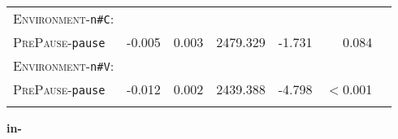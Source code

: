 \begin{table}
{\begin{tabular} {lrrrrrr}
		\textsc{Environment}-\texttt{n\#C}:&&&&&\\
		\textsc{PrePause}-\texttt{pause }&  \color{lsLightGray}-0.005& \color{lsLightGray}0.003& \color{lsLightGray}2479.329 &\color{lsLightGray} -1.731& \color{lsLightGray}0.084 \\ 
		
		\textsc{Environment}-\texttt{n\#V}:&&&&&\\
		\textsc{PrePause}-\texttt{pause} & -0.012 & 0.002& 2439.388& -4.798& $<$0.001 \\ 
		
	\lspbottomrule 
			\end{tabular}
}


\end{table}

\vspace*{-0.6cm}
\textbf{{in-}}

\vspace*{-0.3cm}

